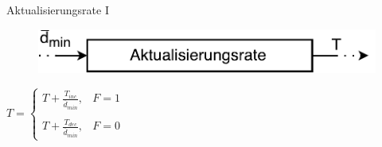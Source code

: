 \documentclass[hyperref={pdfpagelabels=false}]{beamer}
\begin{document}
\begin{frame}{Aktualisierungsrate I}
	\begin{figure}
		\centering
		\includegraphics[width=.8\linewidth]{./Bilder/update_bilder/updaterate_update}
	\end{figure}
	\vspace{2em}
	\begin{center}
		\Large
		$ T = 	\left\{\begin{array}{ll} T + \frac{T_{inc}}{\overline{d}_{min}}, & F = 1 \\
				& \\
				T + \frac{T_{dec}}{\overline{d}_{min}}, & F = 0\end{array}\right.  $
	\end{center}
\end{frame}
\end{document}
